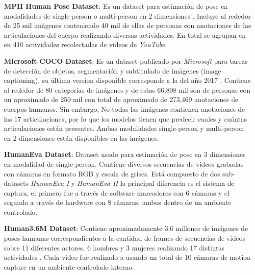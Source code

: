 \textbf{MPII Human Pose Dataset}: Es un dataset para estimación de pose en modalidades de
single-person o multi-person en 2 dimensiones \cite{andriluka14cvpr}. Incluye al rededor de 25 mil
imágenes conteniendo
40 mil de ellas de personas con anotaciones de las articulaciones del cuerpo realizando diversas
actividades. En total se agrupan en en 410 actividades recolectadas de videos de \textit{YouTube}.

\textbf{Microsoft COCO Dataset}: Es un dataset publicado por \textit{Microsoft} para tareas de
detección de objetos, segmentación y subtitulado de imágenes (image captioning), su última version
disponible corresponde a la del año 2017 \cite{DBLP:journals/corr/LinMBHPRDZ14}. Contiene al rededor
de 80 categorías de imágenes y de estas 66,808 mil son de personas con un aproximado de 250 mil
con total de aproximado de 273,469 anotaciones de cuerpos humanos. Sin embargo, No todas las
imágenes contienen anotaciones de las 17 articulaciones, por lo que los modelos tienen que predecir
cuales y cuántas articulaciones están presentes. Ambas modalidades single-person y multi-person en 2
dimensiones están disponibles en las imágenes.



\textbf{HumanEva Dataset}: Dataset usado para estimación de pose en 3 dimensiones en modalidad de
single-person. Contiene diversos secuencias de videos grabadas con cámaras en formato RGB y escala
de grises. Está compuesto de dos sub-datasets \textit{HumanEva I} y \textit{HumanEva II} la principal
diferencia es el sistema de captura, el primero fue a través de software marcadores con 6 cámaras
y el segundo a través de hardware con 8 cámaras, ambos dentro de un ambiente controlado.

\textbf{Human3.6M Dataset}: Contiene aproximadamente 3.6 millones de imágenes de poses humanas
correspondientes a la cantidad de frames de secuencias de videos sobre 11 diferentes actores, 6
hombres y 3 mujeres realizando
17 distintas actividades \cite{6682899}. Cada video fue realizado a usando un total de 10 cámaras de
motion capture en un ambiente controlado interno.

